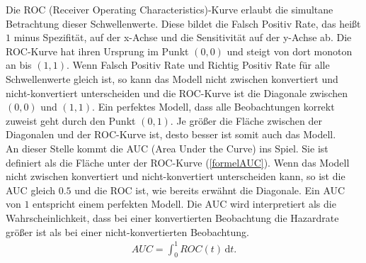 Die ROC (Receiver Operating Characteristics)-Kurve erlaubt die simultane Betrachtung dieser Schwellenwerte. Diese bildet die Falsch Positiv Rate, das heißt $1$ minus Spezifität, auf der x-Achse und die Sensitivität auf der y-Achse ab. Die ROC-Kurve hat ihren Ursprung im Punkt $(0,0)$ und steigt von dort monoton an bis $(1,1)$. Wenn Falsch Positiv Rate und Richtig Positiv Rate für alle Schwellenwerte gleich ist, so kann das Modell nicht zwischen konvertiert und nicht-konvertiert unterscheiden und die ROC-Kurve ist die Diagonale zwischen $(0,0)$ und $(1,1)$. Ein perfektes Modell, dass alle Beobachtungen korrekt zuweist geht durch den Punkt $(0,1)$. Je größer die Fläche zwischen der Diagonalen und der ROC-Kurve ist, desto besser ist somit auch das Modell.\\
An dieser Stelle kommt die AUC (Area Under the Curve) ins Spiel. Sie ist definiert als die Fläche unter der ROC-Kurve (\ref{formelAUC}). Wenn das Modell nicht zwischen konvertiert und nicht-konvertiert unterscheiden kann, so ist die AUC gleich $0.5$ und die ROC ist, wie bereits erwähnt die Diagonale. Ein AUC von $1$ entspricht einem perfekten Modell. Die AUC wird interpretiert als die Wahrscheinlichkeit, dass bei einer konvertierten Beobachtung die Hazardrate größer ist als bei einer nicht-konvertierten Beobachtung.
\begin{align}
	AUC = \int_0^1 \! ROC(t) \, \mathrm{d}t. \label{formelAUC}
\end{align}

